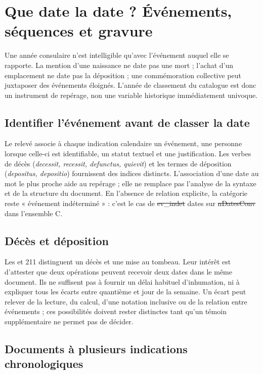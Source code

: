 \chapter{Que date la date ? Événements, séquences et gravure}\label{ch:evenements}

Une année consulaire n’est intelligible qu’avec l’événement auquel elle se rapporte. La mention d’une naissance ne date pas une mort ; l’achat d’un emplacement ne date pas la déposition ; une commémoration collective peut juxtaposer des événements éloignés. L’année de classement du catalogue est donc un instrument de repérage, non une variable historique immédiatement univoque.

\section{Identifier l’événement avant de classer la date}

Le relevé associe à chaque indication calendaire un événement, une personne lorsque celle-ci est identifiable, un statut textuel et une justification. Les verbes de décès (\emph{decessit, recessit, defunctus, quievit}) et les termes de déposition (\emph{depositus, depositio}) fournissent des indices distincts. L’association d’une date au mot le plus proche aide au repérage ; elle ne remplace pas l’analyse de la syntaxe et de la structure du document. En l’absence de relation explicite, la catégorie reste « événement indéterminé » : c’est le cas de \st{ev_indet} dates sur \st{nDatesConv} dans l’ensemble C.

\section{Décès et déposition}

Les  et 211 distinguent un décès et une mise au tombeau. Leur intérêt est d’attester que deux opérations peuvent recevoir deux dates dans le même document. Ils ne suffisent pas à fournir un délai habituel d’inhumation, ni à expliquer tous les écarts entre quantième et jour de la semaine. Un écart peut relever de la lecture, du calcul, d’une notation inclusive ou de la relation entre événements ; ces possibilités doivent rester distinctes tant qu’un témoin supplémentaire ne permet pas de décider.

\section{Documents à plusieurs indications chronologiques}

